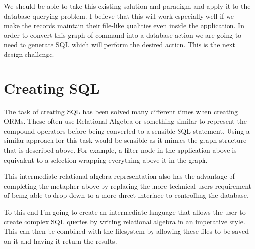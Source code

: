 We should be able to take this existing solution and paradigm and apply it to
the database querying problem. I believe that this will work especially well if
we make the records maintain their file-like qualities even inside the
application. In order to convert this graph of command into a database action
we are going to need to generate \ac{SQL} which will perform the desired
action. This is the next design challenge.

\section{Creating SQL}

The task of creating \ac{SQL} has been solved many different times when
creating \acp{ORM}. These often use Relational Algebra or something similar to
represent the compound operators before being converted to a sensible SQL
statement. Using a similar approach for this task would be sensible as it
mimics the graph structure that is described above. For example, a filter node
in the application above is equivalent to a selection wrapping everything above
it in the graph.

This intermediate relational algebra representation also has the advantage of
completing the metaphor above by replacing the more technical users requirement
of being able to drop down to a more direct interface to controlling the
database.

To this end I'm going to create an intermediate language that allows the user
to create complex \ac{SQL} queries by writing relational algebra in an
imperative style. This can then be combined with the filesystem by allowing
these files to be saved on it and having it return the results.
